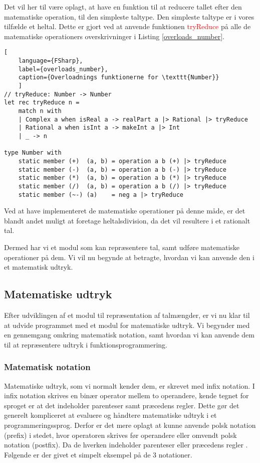Det vil her til være oplagt, at have en funktion til at reducere tallet efter den matematiske operation, til den simpleste taltype. Den simpleste taltype er i vores tilfælde et heltal. Dette er gjort ved at anvende funktionen \textcolor{red}{tryReduce} på alle de matematiske operationers overskrivninger i Listing \ref{overloads_number}. 

\begin{lstlisting}[
    language={FSharp},
    label={overloads_number}, 
    caption={Overloadnings funktionerne for \texttt{Number}}
    ]
// tryReduce: Number -> Number
let rec tryReduce n =
    match n with
    | Complex a when isReal a -> realPart a |> Rational |> tryReduce
    | Rational a when isInt a -> makeInt a |> Int
    | _ -> n
 
type Number with
    static member (+)  (a, b) = operation a b (+) |> tryReduce
    static member (-)  (a, b) = operation a b (-) |> tryReduce
    static member (*)  (a, b) = operation a b (*) |> tryReduce
    static member (/)  (a, b) = operation a b (/) |> tryReduce
    static member (~-) (a)    = neg a |> tryReduce
\end{lstlisting}

Ved at have implementeret de matematiske operationer på denne måde, er det blandt andet muligt at foretage heltalsdivision, da det vil resultere i et rationalt tal.

Dermed har vi et modul som kan repræsentere tal, samt udføre matematiske operationer på dem. Vi vil nu begynde at betragte, hvordan vi kan anvende den i et matematisk udtryk.

\subsection{Matematiske udtryk}
Efter udviklingen af et modul til repræsentation af talmængder, er vi nu klar til at udvide programmet med et modul for matematiske udtryk. Vi begynder med en gennemgang omkring matematisk notation, samt hvordan vi kan anvende dem til at repræsentere udtryk i funktionsprogrammering. 

\subsubsection{Matematisk notation}
Matematiske udtryk, som vi normalt kender dem, er skrevet med infix notation. I infix notation skrives en binær operator mellem to operandere, kende tegnet for sproget er at det indeholder parenteser samt præcedens regler. Dette gør det generelt kompliceret at evaluere og håndtere matematiske udtryk i et programmeringssprog. Derfor er det mere oplagt at kunne anvende polsk notation (prefix) i stedet, hvor operatoren skrives før operandere eller omvendt polsk notation (postfix). Da de hverken indeholder parenteser eller præcedens regler . Følgende er der givet et simpelt eksempel på de 3 notationer. 

